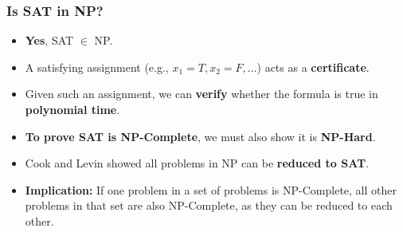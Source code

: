 \begin{frame}
    \frametitle{Is SAT in NP?}

    \begin{itemize}
        \item \textbf{Yes}, SAT $\in$ NP.
        \item A satisfying assignment (e.g., $x_1 = T, x_2 = F, \dots$) acts as a \textbf{certificate}.
        \item Given such an assignment, we can \textbf{verify} whether the formula is true in \textbf{polynomial time}.
        \item \textbf{To prove SAT is NP-Complete}, we must also show it is \textbf{NP-Hard}.
        \item Cook and Levin showed all problems in NP can be \textbf{reduced to SAT}.
        \item \textbf{Implication:} If one problem in a set of problems is NP-Complete, all other problems in that set are also NP-Complete, as they can be reduced to each other.
    \end{itemize}
\end{frame}




